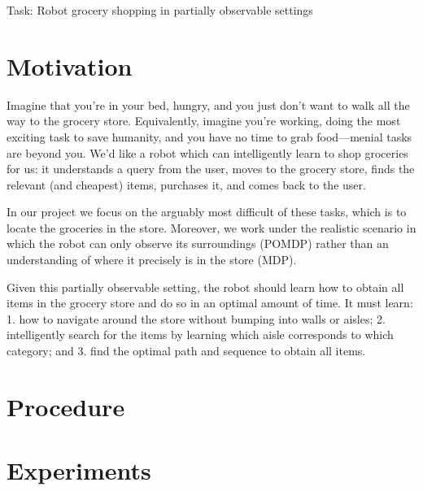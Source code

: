\documentclass{pset}
\begin{document}

\begin{center}
\Large Task: Robot grocery shopping in partially observable settings
\end{center}
\section{Motivation}
\label{sec:motivation}
Imagine that you're in your bed, hungry, and you just don't want to walk
all the way to the grocery store. Equivalently, imagine you're working, doing the
most exciting task to save humanity, and you have no time to grab food---menial
tasks are beyond you. We'd like a robot which can intelligently learn to shop
groceries for us: it understands a query from the user, moves to the
grocery store, finds the relevant (and cheapest) items, purchases it, and comes
back to the user.

In our project we focus on the arguably most difficult of
these tasks, which is to locate the groceries in the store. Moreover, we work
under the realistic
scenario in which the robot can only observe its surroundings (POMDP) rather
than an understanding of where it precisely is in the store (MDP).

Given this partially observable setting, the robot should learn how to obtain
all items in the grocery store and do so in an optimal amount of time. It must
learn: 1. how to navigate around the store without bumping into walls or aisles;
2. intelligently search for the items by learning which aisle corresponds to
which category; and 3. find the optimal path and sequence to obtain all items.

\section{Procedure}
\label{sec:procedure}

\section{Experiments}
\label{sec:experiments}




\end{document}
